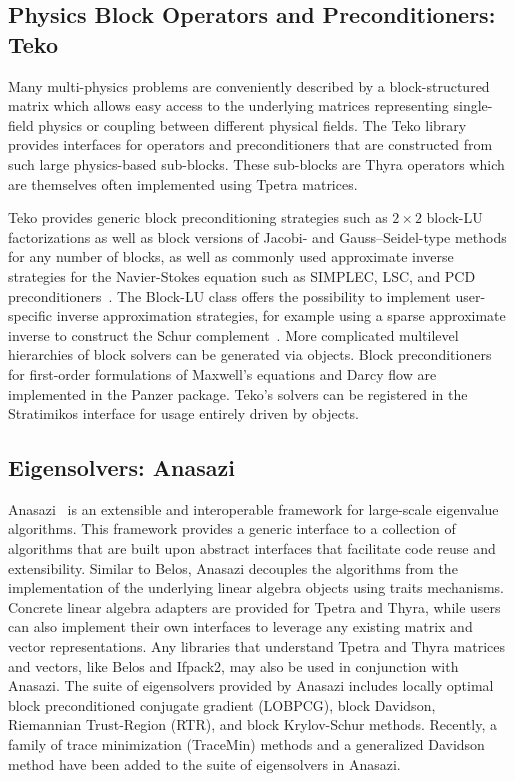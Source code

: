 \subsection{Physics Block Operators and Preconditioners: Teko}
\label{sec:teko}

Many multi-physics problems are conveniently described by a block-structured matrix
which allows easy access to the underlying matrices representing single-field physics or coupling between different physical fields.
The Teko library~\cite{Cyr2016a} provides interfaces for operators and preconditioners that are constructed from such large physics-based sub-blocks.
These sub-blocks are Thyra operators which are themselves often implemented using Tpetra matrices.

Teko provides generic block preconditioning strategies such as $2\times2$ block-LU factorizations as well as block versions of Jacobi- and Gauss--Seidel-type methods for any number of blocks,
as well as commonly used approximate inverse strategies for the Navier-Stokes equation
such as SIMPLEC, LSC, and PCD preconditioners~\cite{CyrShadidEtAl2012_StabilizationScalableBlockPreconditioning}.
The Block-LU class offers the possibility to implement user-specific inverse approximation strategies,
for example using a sparse approximate inverse to construct the Schur complement~\cite{Firmbach2024a}.
More complicated multilevel hierarchies of block solvers can be generated via  objects.
Block preconditioners for first-order formulations of Maxwell's equations and Darcy flow are implemented in the Panzer package.
Teko's solvers can be registered in the Stratimikos interface for usage entirely driven by  objects.

\subsection{Eigensolvers: Anasazi}
Anasazi~\cite{Baker2009a} is an extensible and interoperable framework for large-scale eigenvalue algorithms.
This framework provides a generic interface to a collection of algorithms that are built upon abstract interfaces
that facilitate code reuse and extensibility.  Similar to Belos, Anasazi decouples the algorithms from the
implementation of the underlying linear algebra objects using traits mechanisms.  Concrete linear algebra adapters
are provided for Tpetra and Thyra, while users can also implement their own interfaces to leverage any existing matrix and vector representations. Any libraries that understand Tpetra and Thyra matrices
and vectors, like Belos and Ifpack2, may also be used in conjunction with Anasazi.  The suite of eigensolvers provided
by Anasazi includes locally optimal block preconditioned conjugate gradient (LOBPCG), block Davidson, Riemannian Trust-Region
(RTR), and block Krylov-Schur methods.  Recently, a family of trace minimization (TraceMin) methods and a
generalized Davidson method have been added to the suite of eigensolvers in Anasazi.


